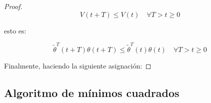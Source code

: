 \begin{proof}
                \begin{equation*}
                    V(t + T) \le V(t) \quad \forall T > t \ge 0
                \end{equation*}

                esto es:

                \begin{equation*}
                    \tilde{\theta}^T(t + T) \theta(t + T) \le \tilde{\theta}^T(t) \theta(t) \quad \forall T > t \ge 0
                \end{equation*}

                Finalmente, haciendo la siguiente asignación:


            \end{proof}


        \subsection{Algoritmo de mínimos cuadrados}
